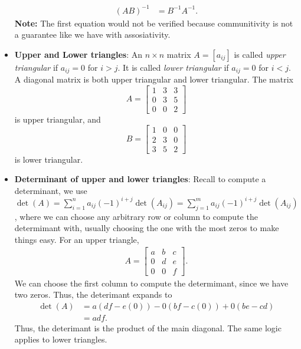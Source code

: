 \documentclass{report}
\begin{document}
\begin{itemize}
\begin{align*}
            (AB)^{-1} &= B^{-1}A^{-1}
        .\end{align*}
        \bigbreak \noindent 
        \textbf{Note:} The first equation would not be verified because communitivity is not a guarantee like we have with assosiativity.
    \item \textbf{Upper and Lower triangles}:
        An \( n \times n \) matrix \( A = [a_{ij}] \) is called \textit{upper triangular} if \( a_{ij} = 0 \) for \( i > j \).
        \bigbreak \noindent 
        It is called \textit{lower triangular} if \( a_{ij} = 0 \) for \( i < j \). A diagonal matrix is both upper triangular and lower triangular.
        \bigbreak \noindent
        The matrix 
        \[
            A = \begin{bmatrix}
                1 & 3 & 3 \\
                0 & 3 & 5 \\
                0 & 0 & 2
            \end{bmatrix}
        \]
        is upper triangular, and
        \[
            B = \begin{bmatrix}
                1 & 0 & 0 \\
                2 & 3 & 0 \\
                3 & 5 & 2
            \end{bmatrix}
        \]
        is lower triangular.
    \item \textbf{Determinant of upper and lower triangles}: Recall to compute a determinant, we use $\det(A) = \sum_{i=1}^{n} a_{ij}(-1)^{i+j}\det(A_{ij})  = \sum_{j=1}^{m}a_{ij}(-1)^{i+j}\det(A_{ij})$, where we can choose any arbitrary row or column to compute the determimant with, usually choosing the one with the most zeros to make things easy. For an upper triangle,
        \begin{align*}
            A = \begin{bmatrix} a & b & c \\0 & d & e \\ 0 & 0 & f\end{bmatrix}
        .\end{align*}
        We can choose the first column to compute the determimant, since we have two zeros. Thus, the deterimant expands to 
        \begin{align*}
            \det(A)&=a(df - e(0)) - 0(bf - c(0)) + 0(be - cd) \\
            &=adf
        .\end{align*}
        Thus, the deterimant is the product of the main diagonal. The same logic applies to lower triangles.

\end{itemize}
\end{document}
